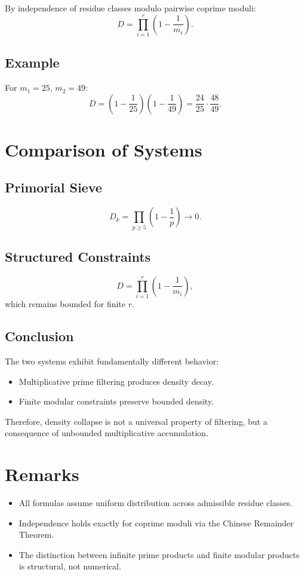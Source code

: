 \documentclass[11pt]{article}
\begin{document}
By independence of residue classes modulo pairwise coprime moduli:
\[
D = \prod_{i=1}^r \left(1 - \frac{1}{m_i}\right).
\]

\subsection{Example}

For $m_1 = 25$, $m_2 = 49$:
\[
D = \left(1 - \frac{1}{25}\right)\left(1 - \frac{1}{49}\right)
= \frac{24}{25} \cdot \frac{48}{49}.
\]

\section{Comparison of Systems}

\subsection{Primorial Sieve}

\[
D_k = \prod_{p \geq 5} \left(1 - \frac{1}{p}\right) \to 0.
\]

\subsection{Structured Constraints}

\[
D = \prod_{i=1}^r \left(1 - \frac{1}{m_i}\right),
\]
which remains bounded for finite $r$.

\subsection{Conclusion}

The two systems exhibit fundamentally different behavior:

\begin{itemize}
\item Multiplicative prime filtering produces density decay.
\item Finite modular constraints preserve bounded density.
\end{itemize}

Therefore, density collapse is not a universal property of filtering, but a consequence of unbounded multiplicative accumulation.

\section{Remarks}

\begin{itemize}
\item All formulas assume uniform distribution across admissible residue classes.
\item Independence holds exactly for coprime moduli via the Chinese Remainder Theorem.
\item The distinction between infinite prime products and finite modular products is structural, not numerical.
\end{itemize}
\end{document}
